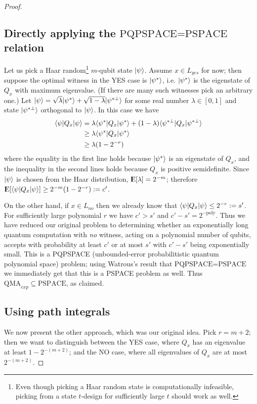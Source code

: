 \documentclass[english]{article}
\numberwithin{equation}{section}
\numberwithin{figure}{section}
\theoremstyle{plain}
\theoremstyle{definition}
\theoremstyle{plain}
\theoremstyle{definition}
\theoremstyle{remark}
\theoremstyle{remark}
\theoremstyle{plain}
\newcommand{\Expect}{{\rm I\kern-.3em E}}
\begin{document}
\begin{proof}
\subsection{Directly applying the $\text{PQPSPACE=PSPACE}$ relation}
Let us pick a Haar random\footnote{Even though picking a Haar random state is computationally infeasible, picking from a state $t$-design for sufficiently large $t$ should work as well.} $m$-qubit state $|\psi\rangle$. Assume $x \in L_{yes}$ for now; then suppose the optimal witness in the YES case is $|\psi^*\rangle$, i.e. $|\psi^*\rangle$ is the eigenstate of $Q_x$ with maximum eigenvalue. (If there are many such witnesses pick an arbitrary one.) Let $|\psi\rangle = \sqrt{\lambda}|\psi^*\rangle + \sqrt{1-\lambda}|\psi^{*\perp}\rangle$ for some real number $\lambda \in [0,1]$ and state $|\psi^{*\perp}\rangle$ orthogonal to $|\psi\rangle$. In this case we have
\begin{align}
\langle \psi|Q_x|\psi\rangle &= \lambda \langle \psi^*|Q_x|\psi^*\rangle + (1-\lambda) \langle \psi^{*\perp}|Q_x|\psi^{*\perp}\rangle \\ 
&\ge \lambda \langle \psi^*|Q_x|\psi^*\rangle \\
&\ge \lambda(1 - 2^{-r})
\end{align}
where the equality in the first line holds because $|\psi^*\rangle$ is an eigenstate of $Q_x$, and the inequality in the second lines holds because $Q_x$ is positive semidefinite. Since $|\psi\rangle$ is chosen from the Haar distribution, $\Expect [\lambda] = 2^{-m}$; therefore $\Expect [\bra{\psi}Q_x\ket{\psi}] \ge 2^{-m}(1-2^{-r}) := c'$.

On the other hand, if $x \in L_{no}$ then we already know that $\langle \psi|Q_x|\psi\rangle \le 2^{-r} := s'$. For sufficiently large polynomial $r$ we have $c' > s'$ and $c' - s' = 2^{-\text{poly}}$. Thus we have reduced our original problem to determining whether an exponentially long quantum computation with \emph{no} witness, acting on a polynomial number of qubits, accepts with probability at least $c'$ or at most $s'$ with $c' - s'$ being exponentially small. This is a PQPSPACE (unbounded-error probabilitistic quantum polynomial space) problem; using Watrous's result that $\text{PQPSPACE=PSPACE}$ we immediately get that this is a PSPACE problem as well. Thus $\text{QMA}_{exp} \subseteq \text{PSPACE}$, as claimed.

\subsection{Using path integrals}
We now present the other approach, which was our original idea. Pick $r = m+2$; then we want to distinguish between the YES case, where $Q_x$ has an eigenvalue at least $1-2^{-(m+2)}$; and the NO case, where all eigenvalues of $Q_x$ are at most $2^{-(m+2)}$.


\end{proof}
\end{document}
